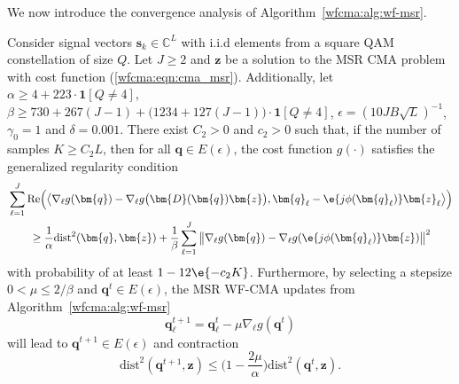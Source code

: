 We now introduce the convergence analysis of Algorithm~\ref{wfcma:alg:wf-msr}. 
\begin{thm2} \label{wfcma:thm:convergence_msr}
Consider signal vectors $\bm{s}_k\in\mathbb{C}^L$ with i.i.d elements from a square QAM constellation of size $Q$. Let $J\geq2$ and $\bm{z}$ be a solution to the MSR CMA problem with cost function (\ref{wfcma:eqn:cma_msr}). Additionally, let $\alpha\geq4+223\cdot\bm{1}[Q\neq4]$, $\beta\geq 730+267(J-1)+\big(1234+127(J-1)\big)\cdot\bm{1}[Q\neq4]$, $\epsilon=(10JB\sqrt{L})^{-1}$, $\gamma_0=1$ and $\delta=0.001$. There exist $C_2>0$ and $c_2>0$ such that, if the number of samples $K\geq C_2 L$, then for all $\bm{q}\in E(\epsilon)$, the cost function $g(\cdot)$ satisfies the generalized regularity condition
\begin{align}
	&\sum_{\ell=1}^J\mathrm{Re}\Big( \big\langle\nabla_{\ell} g(\bm{q})-\nabla_{\ell} g\big(\bm{D}(\bm{q})\bm{z}\big), \bm{q}_{\ell} - \e{j\phi(\bm{q}_{\ell})}\bm{z}_{\ell}\big\rangle\Big)
	\nonumber\\ &\qquad
	\geq\frac{1}{\alpha}\mathrm{dist}^2(\bm{q},\bm{z}) + \frac{1}{\beta}\sum_{\ell=1}^J\big\|\nabla_{\ell} g(\bm{q})-\nabla_{\ell} g(\e{j\phi(\bm{q}_{\ell})}\bm{z})\big\|^2 \label{wfcma:eqn:regularity_condition_msr}
\end{align}
with probability of at least $1 -12\e{-c_2K}$.
Furthermore, by selecting a stepsize $0 < \mu \leq 2/\beta$ and $\bm{q}^{t}\in E(\epsilon)$, the MSR WF-CMA updates from Algorithm~\ref{wfcma:alg:wf-msr}
\begin{equation}
	\bm{q}_{\ell}^{t+1} = \bm{q}_{\ell}^t - \mu\nabla_{\ell} g(\bm{q}^t )
\end{equation}
will lead to $\bm{q}^{t+1}\in E(\epsilon)$ and contraction
\begin{equation}
	\mathrm{dist}^2	(\bm{q}^{t+1} ,\bm{z}) \leq \Big(1 -\frac{2\mu}{\alpha}\Big) \mathrm{dist}^2	(\bm{q}^t,\bm{z}). \label{wfcma:eqn:contraction_thm_msr}
\end{equation}
\end{thm2}

